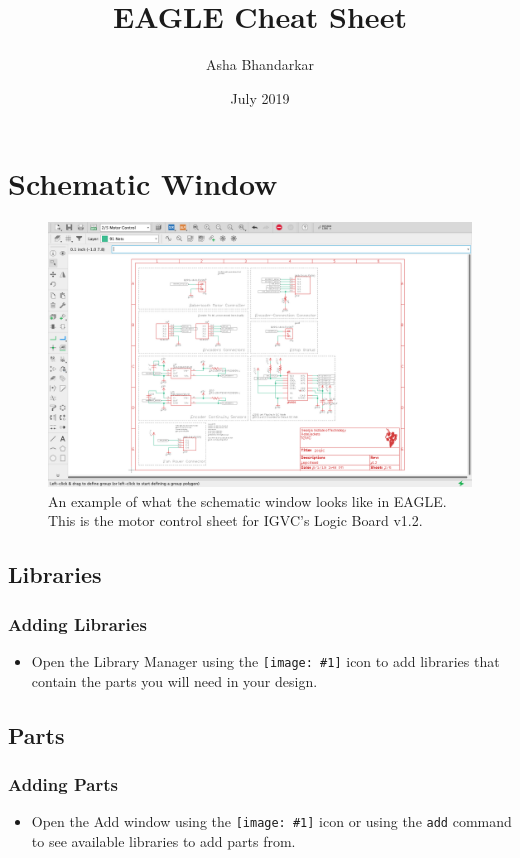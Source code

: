 \documentclass{article}
\title{EAGLE Cheat Sheet}
\author{Asha Bhandarkar}
\date{July 2019}
\newcommand{\icon}[1]{\texttt{[image: \#1]}}
\begin{document}
\maketitle{}
\setcounter{tocdepth}{3}

\pagebreak

\section{Schematic Window}
\begin{figure}[ht]
	\center
	\includegraphics[width=\textwidth, keepaspectratio]{mainschematic.png}
	\caption{An example of what the schematic window looks like in EAGLE. This is the motor control sheet for IGVC's Logic Board v1.2.}
	\label{fig:schematic window}
\end{figure}


\subsection{Libraries}
\subsubsection{Adding Libraries}
\begin{itemize}
    \item Open the Library Manager using the \icon{libraryman.png} icon to add libraries that contain the parts you will need in your design.
\end{itemize}


\subsection{Parts}
\subsubsection{Adding Parts}
\begin{itemize}
    \item Open the Add window using the \icon{partadd.png} icon or using the \texttt{add} command to see available libraries to add parts from.
\end{itemize}
\end{document}
